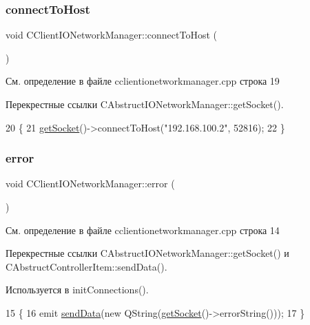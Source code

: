 \subsubsection{\texorpdfstring{connect\+To\+Host}{connectToHost}}
{\footnotesize\ttfamily void C\+Client\+I\+O\+Network\+Manager\+::connect\+To\+Host (\begin{DoxyParamCaption}{ }\end{DoxyParamCaption})\hspace{0.3cm}{\ttfamily [slot]}}



См. определение в файле cclientionetworkmanager.\+cpp строка 19



Перекрестные ссылки C\+Abstruct\+I\+O\+Network\+Manager\+::get\+Socket().


\begin{DoxyCode}
20 \{
21     \hyperlink{class_c_abstruct_i_o_network_manager_a118a2c8254c149614cba51c42147c709}{getSocket}()->connectToHost(\textcolor{stringliteral}{"192.168.100.2"}, 52816);
22 \}
\end{DoxyCode}
\hypertarget{class_c_client_i_o_network_manager_a1a4c3fd9405b85cb43e20b24d9db18e8}{}\label{class_c_client_i_o_network_manager_a1a4c3fd9405b85cb43e20b24d9db18e8} 
\subsubsection{\texorpdfstring{error}{error}}
{\footnotesize\ttfamily void C\+Client\+I\+O\+Network\+Manager\+::error (\begin{DoxyParamCaption}\item[{Q\+Abstract\+Socket\+::\+Socket\+Error}]{ }\end{DoxyParamCaption})\hspace{0.3cm}{\ttfamily [slot]}}



См. определение в файле cclientionetworkmanager.\+cpp строка 14



Перекрестные ссылки C\+Abstruct\+I\+O\+Network\+Manager\+::get\+Socket() и C\+Abstruct\+Controller\+Item\+::send\+Data().



Используется в init\+Connections().


\begin{DoxyCode}
15 \{
16     emit \hyperlink{class_c_abstruct_controller_item_a7cf2bebc87a7d0b660318e946a176eb9}{sendData}(\textcolor{keyword}{new} QString(\hyperlink{class_c_abstruct_i_o_network_manager_a118a2c8254c149614cba51c42147c709}{getSocket}()->errorString()));
17 \}
\end{DoxyCode}
\hypertarget{class_c_client_i_o_network_manager_aeb1564c209ae8b790cf799075cfa6a98}{}\label{class_c_client_i_o_network_manager_aeb1564c209ae8b790cf799075cfa6a98} 
